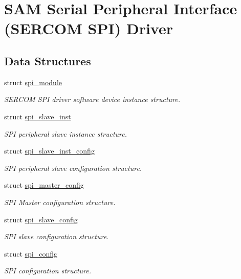 \hypertarget{group__asfdoc__sam0__sercom__spi__group}{}\section{S\+AM Serial Peripheral Interface (S\+E\+R\+C\+OM S\+PI) Driver}
\label{group__asfdoc__sam0__sercom__spi__group}
\subsection*{Data Structures}
\begin{DoxyCompactItemize}
\item 
struct \mbox{\hyperlink{structspi__module}{spi\+\_\+module}}
\begin{DoxyCompactList}\small\item\em S\+E\+R\+C\+OM S\+PI driver software device instance structure. \end{DoxyCompactList}\item 
struct \mbox{\hyperlink{structspi__slave__inst}{spi\+\_\+slave\+\_\+inst}}
\begin{DoxyCompactList}\small\item\em S\+PI peripheral slave instance structure. \end{DoxyCompactList}\item 
struct \mbox{\hyperlink{structspi__slave__inst__config}{spi\+\_\+slave\+\_\+inst\+\_\+config}}
\begin{DoxyCompactList}\small\item\em S\+PI peripheral slave configuration structure. \end{DoxyCompactList}\item 
struct \mbox{\hyperlink{structspi__master__config}{spi\+\_\+master\+\_\+config}}
\begin{DoxyCompactList}\small\item\em S\+PI Master configuration structure. \end{DoxyCompactList}\item 
struct \mbox{\hyperlink{structspi__slave__config}{spi\+\_\+slave\+\_\+config}}
\begin{DoxyCompactList}\small\item\em S\+PI slave configuration structure. \end{DoxyCompactList}\item 
struct \mbox{\hyperlink{structspi__config}{spi\+\_\+config}}
\begin{DoxyCompactList}\small\item\em S\+PI configuration structure. \end{DoxyCompactList}\end{DoxyCompactItemize}
